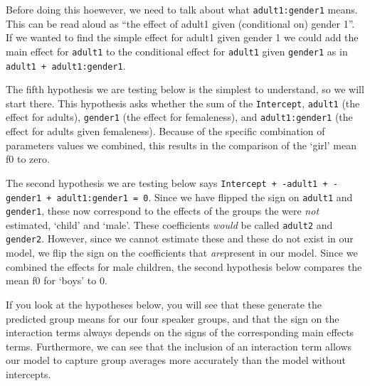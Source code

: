 \documentclass[
]{book}
\begin{document}
Before doing this hoewever, we need to talk about what \texttt{adult1:gender1} means. This can be read aloud as ``the effect of adult1 given (conditional on) gender 1''. If we wanted to find the simple effect for adult1 given gender 1 we could add the main effect for \texttt{adult1} to the conditional effect for \texttt{adult1} given \texttt{gender1} as in \texttt{adult1\ +\ adult1:gender1}.

The fifth hypothesis we are testing below is the simplest to understand, so we will start there. This hypothesis asks whether the sum of the \texttt{Intercept}, \texttt{adult1} (the effect for adults), \texttt{gender1} (the effect for femaleness), and \texttt{adult1:gender1} (the effect for adults given femaleness). Because of the specific combination of parameters values we combined, this results in the comparison of the `girl' mean f0 to zero.

The second hypothesis we are testing below says \texttt{Intercept\ +\ -adult1\ +\ -gender1\ +\ adult1:gender1\ =\ 0}. Since we have flipped the sign on \texttt{adult1} and \texttt{gender1}, these now correspond to the effects of the groups the were \emph{not} estimated, `child' and `male'. These coefficients \emph{would} be called \texttt{adult2} and \texttt{gender2}. However, since we cannot estimate these and these do not exist in our model, we flip the sign on the coefficients that \emph{are}present in our model. Since we combined the effects for male children, the second hypothesis below compares the mean f0 for `boys' to 0.

If you look at the hypotheses below, you will see that these generate the predicted group means for our four speaker groups, and that the sign on the interaction terms always depends on the signs of the corresponding main effects terms. Furthermore, we can see that the inclusion of an interaction term allows our model to capture group averages more accurately than the model without intercepts.
\end{document}
